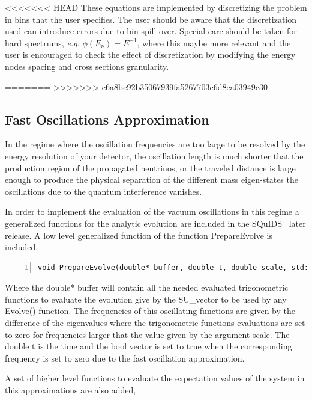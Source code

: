 \documentclass[3p,12pt]{elsarticle}
\newcommand{\ttf}{\ttfamily}
\begin{document}
<<<<<<< HEAD
These equations are implemented by discretizing the problem in bins that the user
specifies. The user should be aware that the discretization used can introduce errors due to
bin spill-over. Special care should be taken for hard spectrums,
{\it e.g.} $\phi(E_\nu) = E^{-1}$, where this maybe more relevant and the user is encouraged
to check the effect of discretization by modifying the energy nodes spacing and cross sections granularity.

=======
>>>>>>> c6a8be92b35067939fa5267703c6d8ea03949c30

\subsection{Fast Oscillations Approximation}

In the regime where the oscillation frequencies are too large to be
resolved by the energy resolution of your detector, the oscillation length is much
shorter that the production region of the propagated neutrinos, or the
traveled distance is large enough to produce the physical separation
of the different mass eigen-states the oscillations due to the quantum
interference vanishes.

In order to implement the evaluation of the vacuum oscillations in
this regime a generalized functions for the analytic evolution are included in
the SQuIDS~\cite{SQUIDS} later release. A low level generalized function of the function {\ttf PrepareEvolve} is included.

\begin{lstlisting}[frame=leftline, numbers = left,breaklines=true, label = ex:sin1,firstnumber=last]
  void PrepareEvolve(double* buffer, double t, double scale, std::vector<bool>& avr) const
\end{lstlisting}
Where the {\ttf double* buffer}  will contain all the needed evaluated
trigonometric functions to evaluate the evolution give by the {\ttf
  SU\_vector} to be used by any {\ttf Evolve()} function. The frequencies of this oscillating functions are given by the
difference of the eigenvalues where the trigonometric functions
evaluations are set to zero for frequencies
larger that the value given by the argument {\ttfdouble scale}.
The {\ttf double t} is the time and the {\ttf bool} vector is set to
{\ttf true} when the corresponding frequency is set to zero due to the fast
oscillation approximation.

A set of higher level functions to evaluate the expectation values of
the system in this approximations are also added,
\end{document}
